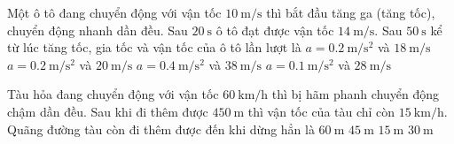 \begin{ex}
	Một ô tô đang chuyển động với vận tốc $\SI{10}{\meter/\second}$ thì bắt đầu tăng ga (tăng tốc), chuyển động nhanh dần đều. Sau $\SI{20}{\second}$ ô tô đạt được vận tốc $\SI{14}{\meter/\second}$. Sau $\SI{50}{\second}$ kể từ lúc tăng tốc, gia tốc và vận tốc của ô tô lần lượt là
	\choice
	{$a=\SI{0.2}{\meter/\second^2}$ và $\SI{18}{\meter/\second}$}
	{\True $a=\SI{0.2}{\meter/\second^2}$ và $\SI{20}{\meter/\second}$}
	{$a=\SI{0.4}{\meter/\second^2}$ và $\SI{38}{\meter/\second}$}
	{$a=\SI{0.1}{\meter/\second^2}$ và $\SI{28}{\meter/\second}$}
\end{ex}

\begin{ex}
	Tàu hỏa đang chuyển động với vận tốc $\SI{60}{\kilo\meter/\hour}$ thì bị hãm phanh chuyển động chậm dần đều. Sau khi đi thêm được $\SI{450}{\meter}$ thì vận tốc của tàu chỉ còn $\SI{15}{\kilo\meter/\hour}$. Quãng đường tàu còn đi thêm được đến khi dừng hẳn là
	\choice
	{$\SI{60}{\meter}$}
	{$\SI{45}{\meter}$}
	{$\SI{15}{\meter}$}
	{\True $\SI{30}{\meter}$}
\end{ex}

